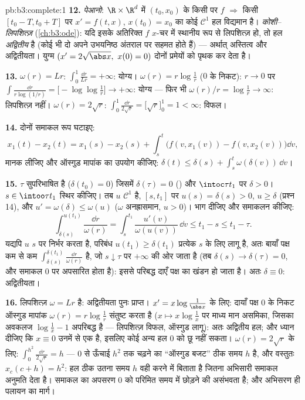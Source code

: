 \begin{solution}{pb:b3:complete:1}
\textbf{12.} \emph{पेआनो}: $\R\times\R^d$ में $(t_0, x_0)$ के किसी  पर 
$f$ $\Rightarrow$ किसी $[t_0 - T, t_0 + T]$ पर $x' = f(t,x)$, $x(t_0) = x_0$ का कोई $\mathcal C^1$ हल विद्यमान है।
\emph{कोशी--लिपशित्ज़} (\cref{ch:b3:ode}): यदि इसके अतिरिक्त $f$ $x$-चर में
स्थानीय रूप से लिपशित्ज़ हो, तो हल \emph{अद्वितीय} है (कोई भी दो
अपने उभयनिष्ठ अंतराल पर सहमत होते हैं) --- अर्थात् अस्तित्व और
अद्वितीयता। युग्म $(x' = 2\sqrt{\abs x},\ x(0) = 0)$ दोनों प्रमेयों को पृथक कर देता है।

\textbf{13.} $\omega(r) = Lr$: $\int_0^1\frac{\dd r}{Lr} =
+\infty$: योग्य। $\omega(r) = r\log\frac1r$ ($0$ के निकट): $r \to 0$ पर
$\int\frac{\dd r}{r\log(1/r)} = \bigl[-\log\log\frac1r\bigr]
\to +\infty$: योग्य --- फिर भी $\omega(r)/r =
\log\frac1r \to \infty$: लिपशित्ज़ नहीं। $\omega(r) = 2\sqrt
r$: $\int_0^1\frac{\dd r}{2\sqrt r} = \bigl[\sqrt r\bigr]_0^1
= 1 < \infty$: विफल।

\textbf{14.} दोनों समाकल रूप घटाइए:
\[
x_1(t) - x_2(t) = x_1(s) - x_2(s) + \int_s^t\bigl(f(v,
x_1(v)) - f(v, x_2(v))\bigr)\dd v,
\]
मानक लीजिए और ऑस्गुड मापांक का उपयोग कीजिए: $\delta(t) \leq
\delta(s) + \int_s^t\omega(\delta(v))\,\dd v$।

\textbf{15.} $\tau$ सुपरिभाषित है ($\delta(t_0) = 0$) जिसमें $\delta(\tau) = 0$ () और
$\intoc\tau{t_1}$ पर $\delta > 0$। $s \in \intoo\tau{t_1}$ स्थिर कीजिए। तब $u$ $\mathcal C^1$ है, $[s, t_1]$ पर
$u(s) = \delta(s) > 0$, $u \geq \delta$ (प्रश्न 14), और $u' = \omega(\delta) \leq
\omega(u)$ ($\omega$ अनह्रासमान, $u > 0$)। भाग
दीजिए और समाकलन कीजिए:
\[
\int_{\delta(s)}^{u(t_1)}\frac{\dd r}{\omega(r)}
= \int_s^{t_1}\frac{u'(v)}{\omega(u(v))}\,\dd v \leq t_1 - s
\leq t_1 - \tau .
\]
यद्यपि $u$ $s$ पर निर्भर करता है, परिबंध $u(t_1) \geq
\delta(t_1)$ प्रत्येक $s$
के लिए लागू है, अतः बायाँ पक्ष कम से कम $\int_{\delta(s)}^{\delta(t_1)}\frac{\dd r}{\omega(r)}$ है, जो $s \downarrow \tau$ पर $+\infty$
की ओर जाता है (तब $\delta(s) \to \delta(\tau) = 0$, और समाकल $0$ पर अपसारित होता है): इससे
परिबद्ध दाएँ पक्ष का खंडन हो जाता है। अतः $\delta \equiv 0$: अद्वितीयता।

\textbf{16.} लिपशित्ज़ $\omega = Lr$ है: अद्वितीयता पुनः प्राप्त। $x' = x\log\frac1{\abs x}$ के
लिए: दायाँ पक्ष $0$ के निकट ऑस्गुड मापांक $\omega(r) = r\log\frac1r$ संतुष्ट करता है
($x \mapsto x\log\frac1x$ पर माध्य मान असमिका, जिसका अवकलज $\log\frac1x - 1$ अपरिबद्ध है ---
लिपशित्ज़ विफल, ऑस्गुड लागू): अतः अद्वितीय हल; और ध्यान दीजिए कि
$x \equiv 0$ उनमें से एक है, इसलिए कोई अन्य हल $0$ को छू नहीं सकता। $\omega(r) = 2\sqrt r$
के लिए: $\int_0^{h^2}\frac{\dd r}{2\sqrt r} = h$ --- $0$ से ऊँचाई $h^2$ तक चढ़ने का ``ऑस्गुड बजट''
ठीक समय $h$ है, और वस्तुतः $x_c(c + h) = h^2$: हल ठीक उतना समय $h$ वही करने
में बिताता है जितना अभिसारी समाकल अनुमति देता है। समाकल का अपसरण
$0$ को परिमित समय में छोड़ने की असंभवता है; और अभिसरण ही पलायन का
मार्ग।


\end{solution}
